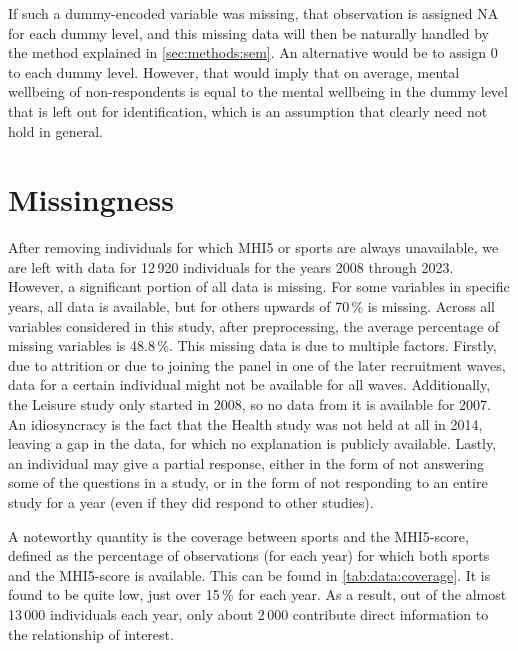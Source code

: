 If such a dummy-encoded variable was missing, that observation is assigned NA for each dummy level, and this missing
data will then be naturally handled by the method explained in \cref{sec:methods:sem}. %
An alternative would be to assign 0 to each dummy level. However, that would imply that on average, mental wellbeing of non-respondents
is equal to the mental wellbeing in the dummy level that is left out for identification, which is an assumption that
clearly need not hold in general.

\section{Missingness}
\label{sec:data:missingness}
After removing individuals for which MHI5 or sports are always unavailable, we are left with data for 12\,920 individuals
for the years 2008 through 2023.
However, a significant portion of all data is missing. For some variables in specific years, all data is available,
but for others upwards of 70\,\% is missing. Across all variables considered in this study, after preprocessing,
the average percentage of missing variables is 48.8\,\%.
This missing data is due to multiple factors. Firstly, due to attrition or due to joining the panel
in one of the later recruitment waves, data for a certain individual might not be available for all waves.
Additionally, the Leisure study only started in 2008, so no data from it is available for 2007. An idiosyncracy is
the fact that the Health study was not held at all in 2014, leaving a gap in the data, for which no explanation is publicly
available.
Lastly, an individual may give a partial response, either in the form of not answering some of the questions in a study,
or in the form of not responding to an entire study for a year (even if they did respond to other studies).

A noteworthy quantity is the coverage between sports and the MHI5-score, defined as the percentage of observations
(for each year) for which both sports and the MHI5-score is available.
This can be found in \cref{tab:data:coverage}. It is found to be quite low, just over 15\,\% for each year. As a result,
out of the almost 13\,000 individuals each year, only about 2\,000 contribute direct information to the relationship of interest.


